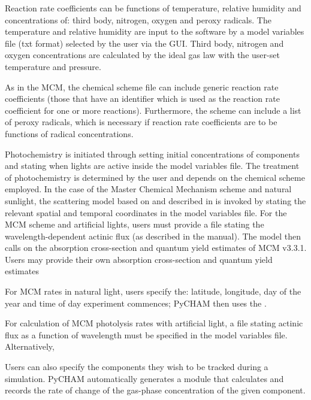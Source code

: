\documentclass[gmd, manuscript]{copernicus}
\begin{document}
Reaction rate coefficients can be functions of temperature, relative humidity and concentrations of: third body, nitrogen, oxygen and peroxy radicals.  The temperature and relative humidity are input to the software by a model variables file (txt format) selected by the user via the GUI.  Third body, nitrogen and oxygen concentrations are calculated by the ideal gas law with the user-set temperature and pressure.

As in the MCM, the chemical scheme file can include generic reaction rate coefficients (those that have an identifier which is used as the reaction rate coefficient for one or more reactions).  Furthermore, the scheme can include a list of peroxy radicals, which is necessary if reaction rate coefficients are to be functions of radical concentrations.

Photochemistry is initiated through setting initial concentrations of components and stating when lights are active inside the model variables file.  The treatment of photochemistry is determined by the user and depends on the chemical scheme employed.  In the case of the Master Chemical Mechanism scheme and natural sunlight, the scattering model based on \citet{Hayman1997} and described in \citet{Saunders2003} is invoked by stating the relevant spatial and temporal coordinates in the model variables file.  For the MCM scheme and artificial lights, users must provide a file stating the wavelength-dependent actinic flux (as described in the manual).  The model then calls on the absorption cross-section and quantum yield estimates of MCM v3.3.1.  Users may provide their own absorption cross-section and quantum yield estimates



For MCM rates in natural light, users specify the: latitude, longitude, day of the year and time of day experiment commences; PyCHAM then uses the .  

For calculation of MCM photolysis rates with artificial light, a file stating actinic flux as a function of wavelength must be specified in the model variables file.  Alternatively, 

Users can also specify the components they wish to be tracked during a simulation.  PyCHAM automatically generates a module that calculates and records the rate of change of the gas-phase concentration of the given component.
\end{document}
